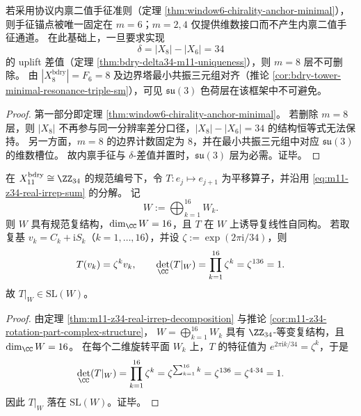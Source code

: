 \begin{corollary}[内禀手征读出强制色荷层保留]\label{cor:m11-intrinsic-chirality-forces-color-layer}
若采用协议内禀二值手征准则（定理 \ref{thm:window6-chirality-anchor-minimal}），则手征锚点被唯一固定在 \(m=6\)；\(m=2,4\) 仅提供维数接口而不产生内禀二值手征通道。
在此基础上，一旦要求实现
\[
\delta=|X_8|-|X_6|=34
\]
的 uplift 差值（定理 \ref{thm:bdry-delta34-m11-uniqueness}），则 \(m=8\) 层不可删除。
由 \(|X_8^{\mathrm{bdry}}|=F_6=8\) 及边界塔最小共振三元组对齐（推论 \ref{cor:bdry-tower-minimal-resonance-triple-sm}），可见 \(\mathfrak{su}(3)\) 色荷层在该框架中不可避免。
\end{corollary}
\begin{proof}
第一部分即定理 \ref{thm:window6-chirality-anchor-minimal}。
若删除 \(m=8\) 层，则 \(|X_8|\) 不再参与同一分辨率差分口径，\(|X_8|-|X_6|=34\) 的结构恒等式无法保持。
另一方面，\(m=8\) 的边界计数固定为 \(8\)，并在最小共振三元组中对应 \(\mathfrak{su}(3)\) 的维数槽位。
故内禀手征与 \(\delta\)-差值并置时，\(\mathfrak{su}(3)\) 层为必需。证毕。
\end{proof}

\begin{proposition}[\texorpdfstring{$m=11$}{m=11} 电荷层的规范 \texorpdfstring{$16$}{16} 维复模与单位行列式]\label{prop:m11-canonical-16-complex-module-det-one}
在 \(X_{11}^{\mathrm{bdry}}\cong \ZZ_{34}\) 的规范编号下，令 \(T:e_j\mapsto e_{j+1}\) 为平移算子，并沿用 \eqref{eq:m11-z34-real-irrep-sum} 的分解。
记
\[
W:=\bigoplus_{k=1}^{16}W_k.
\]
则 \(W\) 具有规范复结构，\(\dim_{\CC}W=16\)，且 \(T\) 在 \(W\) 上诱导复线性自同构。
若取复基 \(v_k=C_k+\mathrm{i}S_k\)（\(k=1,\dots,16\)），并设 \(\zeta:=\exp(2\pi \mathrm{i}/34)\)，则
\[
T(v_k)=\zeta^k v_k,\qquad
\det_{\CC}(T|_W)=\prod_{k=1}^{16}\zeta^k=\zeta^{136}=1.
\]
故 \(T|_W\in \mathrm{SL}(W)\)。
\end{proposition}
\begin{proof}
由定理 \ref{thm:m11-z34-real-irrep-decomposition} 与推论 \ref{cor:m11-z34-rotation-part-complex-structure}，
\(W=\bigoplus_{k=1}^{16}W_k\) 具有 \(\ZZ_{34}\)-等变复结构，且 \(\dim_{\CC}W=16\)。
在每个二维旋转平面 \(W_k\) 上，\(T\) 的特征值为 \(e^{2\pi \mathrm{i}k/34}=\zeta^k\)，于是
\[
\det_{\CC}(T|_W)=\prod_{k=1}^{16}\zeta^k
=\zeta^{\sum_{k=1}^{16}k}
=\zeta^{136}
=\zeta^{4\cdot 34}=1.
\]
因此 \(T|_W\) 落在 \(\mathrm{SL}(W)\)。证毕。
\end{proof}

